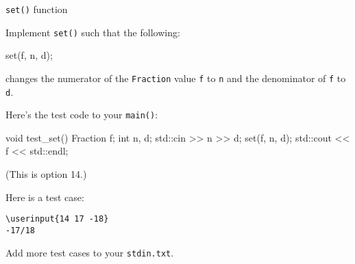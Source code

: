 \verb!set()! function

Implement \verb!set()! such that the following:
\begin{console}
set(f, n, d);
\end{console}
changes the numerator of the \verb!Fraction! value \verb!f! to \verb!n! and the
denominator of \verb!f! to \verb!d!.

Here's the test code to your \verb!main()!:
\begin{console}
void test_set()
{
    Fraction f;
    int n, d;
    std::cin >> n >> d;
    set(f, n, d);
    std::cout << f << std::endl;
}
\end{console}
(This is option 14.)

Here is a test case:

\resett
\nextt
\begin{Verbatim}[frame=single, commandchars=\\\{\}]
\userinput{14 17 -18}
-17/18
\end{Verbatim}

Add more test cases to your \verb!stdin.txt!.
